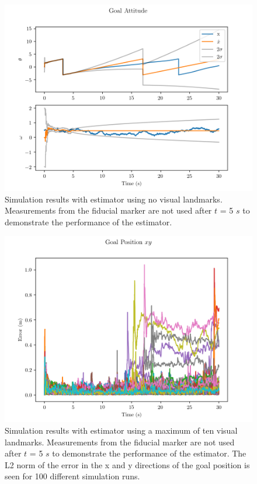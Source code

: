 \begin{figure}
  \centering
  \includegraphics[scale=0.5]{plots/no_lms_gatt.png}
  \caption{Simulation results with estimator using no visual
  landmarks. Measurements from the fiducial marker are not used after $t$ = 5
$s$ to demonstrate the performance of the estimator.}
  \label{fig:no_lms_gatt}
\end{figure}

\begin{figure}
  \centering
  \includegraphics[scale=0.5]{plots/mc_with_lms_xy_err.png}
  \caption{Simulation results with estimator using a maximum of ten visual
  landmarks. Measurements from the fiducial marker are not used after $t$ = 5
$s$ to demonstrate the performance of the estimator. The L2 norm of the error in
the x and y directions of the goal position is seen for 100 different simulation
runs.}
  \label{fig:mc_with_lms_xy_err}
\end{figure}

